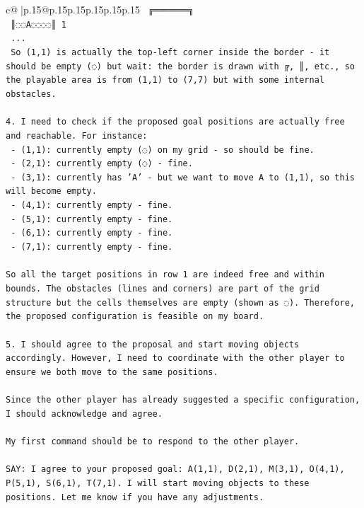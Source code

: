 \documentclass{article}
\begin{document}
{\begin{supertabular}{c@{$\;$}|p{.15\linewidth}@{}p{.15\linewidth}p{.15\linewidth}p{.15\linewidth}p{.15\linewidth}p{.15\linewidth}}
{{{\texttt{        ╔═══════╗} \\
\texttt{        ║◌◌A◌◌◌◌║ 1} \\
\texttt{        ...} \\
\texttt{     So (1,1) is actually the top{-}left corner inside the border {-} it should be empty (◌) but wait: the border is drawn with ╔, ║, etc., so the playable area is from (1,1) to (7,7) but with some internal obstacles.} \\
\\ 
\texttt{4. I need to check if the proposed goal positions are actually free and reachable. For instance:} \\
\texttt{   {-} (1,1): currently empty (◌) on my grid {-} so should be fine.} \\
\texttt{   {-} (2,1): currently empty (◌) {-} fine.} \\
\texttt{   {-} (3,1): currently has 'A' {-} but we want to move A to (1,1), so this will become empty.} \\
\texttt{   {-} (4,1): currently empty {-} fine.} \\
\texttt{   {-} (5,1): currently empty {-} fine.} \\
\texttt{   {-} (6,1): currently empty {-} fine.} \\
\texttt{   {-} (7,1): currently empty {-} fine.} \\
\\ 
\texttt{So all the target positions in row 1 are indeed free and within bounds. The obstacles (lines and corners) are part of the grid structure but the cells themselves are empty (shown as ◌). Therefore, the proposed configuration is feasible on my board.} \\
\\ 
\texttt{5. I should agree to the proposal and start moving objects accordingly. However, I need to coordinate with the other player to ensure we both move to the same positions.} \\
\\ 
\texttt{Since the other player has already suggested a specific configuration, I should acknowledge and agree.} \\
\\ 
\texttt{My first command should be to respond to the other player.} \\
\\ 
\texttt{SAY: I agree to your proposed goal: A(1,1), D(2,1), M(3,1), O(4,1), P(5,1), S(6,1), T(7,1). I will start moving objects to these positions. Let me know if you have any adjustments.} \\
            }
        }
    }
     \\ \\


\end{supertabular}}
\end{document}
